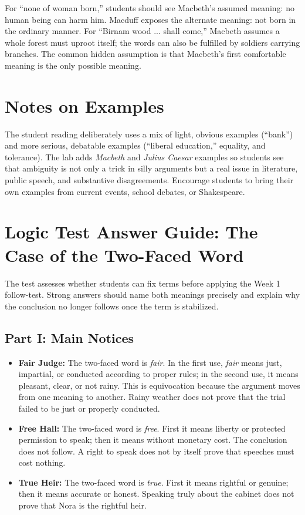 \documentclass[12pt]{article}
\begin{document}
For ``none of woman born,'' students should see Macbeth's assumed meaning: no human being can harm him. Macduff exposes the alternate meaning: not born in the ordinary manner. For ``Birnam wood ... shall come,'' Macbeth assumes a whole forest must uproot itself; the words can also be fulfilled by soldiers carrying branches. The common hidden assumption is that Macbeth's first comfortable meaning is the only possible meaning.

\section*{Notes on Examples}
The student reading deliberately uses a mix of light, obvious examples (“bank”) and more serious, debatable examples (“liberal education,” equality, and tolerance). The lab adds \textit{Macbeth} and \textit{Julius Caesar} examples so students see that ambiguity is not only a trick in silly arguments but a real issue in literature, public speech, and substantive disagreements. Encourage students to bring their own examples from current events, school debates, or Shakespeare.

\section*{Logic Test Answer Guide: The Case of the Two-Faced Word}
The test assesses whether students can fix terms before applying the Week 1 follow-test. Strong answers should name both meanings precisely and explain why the conclusion no longer follows once the term is stabilized.

\subsection*{Part I: Main Notices}
\begin{itemize}[leftmargin=*]
\item \textbf{Fair Judge:} The two-faced word is \textit{fair}. In the first use, \textit{fair} means just, impartial, or conducted according to proper rules; in the second use, it means pleasant, clear, or not rainy. This is equivocation because the argument moves from one meaning to another. Rainy weather does not prove that the trial failed to be just or properly conducted.
\item \textbf{Free Hall:} The two-faced word is \textit{free}. First it means liberty or protected permission to speak; then it means without monetary cost. The conclusion does not follow. A right to speak does not by itself prove that speeches must cost nothing.
\item \textbf{True Heir:} The two-faced word is \textit{true}. First it means rightful or genuine; then it means accurate or honest. Speaking truly about the cabinet does not prove that Nora is the rightful heir.
\end{itemize}
\end{document}
